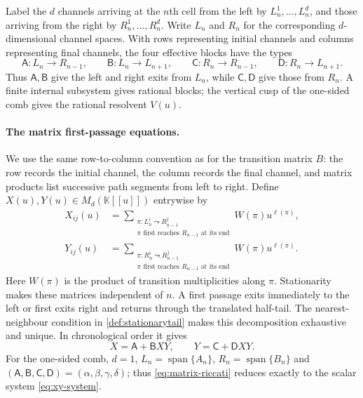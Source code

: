 \documentclass[11pt,reqno]{amsart}
\numberwithin{equation}{section}
\theoremstyle{definition}
\theoremstyle{remark}
\begin{document}
Label the $d$ channels arriving at the $n$th cell from the left by
$L_n^1,\ldots,L_n^d$, and those arriving from the right by
$R_n^1,\ldots,R_n^d$.  Write $L_n$ and $R_n$ for the corresponding
$d$-dimensional channel spaces.  With rows representing initial channels and
columns representing final channels, the four effective blocks have the
types
\[
 \mathsf A:L_n\longrightarrow R_{n-1},\qquad
 \mathsf B:L_n\longrightarrow L_{n+1},\qquad
 \mathsf C:R_n\longrightarrow R_{n-1},\qquad
 \mathsf D:R_n\longrightarrow L_{n+1}.
\]
Thus $\mathsf A,\mathsf B$ give the left and right exits from $L_n$, while
$\mathsf C,\mathsf D$ give those from $R_n$.  A finite internal subsystem
gives rational blocks; the vertical cusp of the one-sided comb gives the
rational resolvent $V(u)$.

\paragraph{The matrix first-passage equations.}
We use the same row-to-column convention as for the transition matrix $B$:
the row records the initial channel, the column records the final channel,
and matrix products list successive path segments from left to right.  Define
$X(u),Y(u)\in M_d(\mathbb K[[u]])$ entrywise by
\begin{align*}
 X_{ij}(u)
 &=\sum_{\substack{\pi:L_n^i\leadsto R_{n-1}^j\\
                    \pi\text{ first reaches }R_{n-1}\text{ at its end}}}
   W(\pi)u^{\ell(\pi)},\\
 Y_{ij}(u)
 &=\sum_{\substack{\pi:R_n^i\leadsto R_{n-1}^j\\
                    \pi\text{ first reaches }R_{n-1}\text{ at its end}}}
   W(\pi)u^{\ell(\pi)}.
\end{align*}
Here $W(\pi)$ is the product of transition multiplicities along $\pi$.
Stationarity makes these matrices independent of $n$.  A first passage exits
immediately to the left or first exits right and returns through the translated
half-tail.  The nearest-neighbour condition in
\cref{def:stationarytail} makes this decomposition exhaustive and unique.
In chronological order it gives
\begin{equation}\label{eq:matrix-riccati}
 X=\mathsf A+\mathsf BXY,
 \qquad
 Y=\mathsf C+\mathsf DXY.
\end{equation}
For the one-sided comb, $d=1$, $L_n=\operatorname{span}\{A_n\}$,
$R_n=\operatorname{span}\{B_n\}$ and
$(\mathsf A,\mathsf B,\mathsf C,\mathsf D)
=(\alpha,\beta,\gamma,\delta)$; thus \eqref{eq:matrix-riccati} reduces
exactly to the scalar system \eqref{eq:xy-system}.
\end{document}
